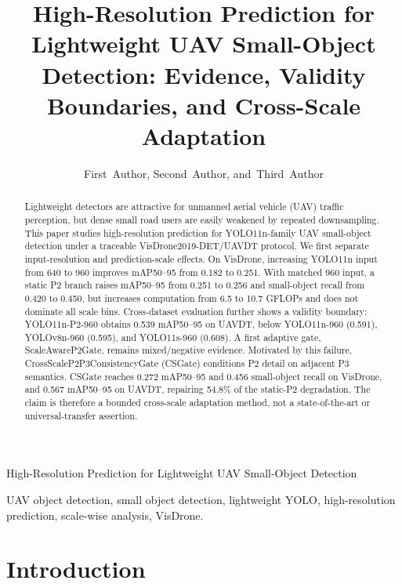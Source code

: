 \documentclass[journal]{IEEEtran}
\begin{document}
\title{High-Resolution Prediction for Lightweight UAV Small-Object Detection: Evidence, Validity Boundaries, and Cross-Scale Adaptation}

\author{First~Author,
        Second~Author,
        and~Third~Author}

%
{High-Resolution Prediction for Lightweight UAV Small-Object Detection}

\maketitle

\begin{abstract}
Lightweight detectors are attractive for unmanned aerial vehicle (UAV) traffic perception, but dense small road users are easily weakened by repeated downsampling. This paper studies high-resolution prediction for YOLO11n-family UAV small-object detection under a traceable VisDrone2019-DET/UAVDT protocol. We first separate input-resolution and prediction-scale effects. On VisDrone, increasing YOLO11n input from 640 to 960 improves mAP50--95 from 0.182 to 0.251. With matched 960 input, a static P2 branch raises mAP50--95 from 0.251 to 0.256 and small-object recall from 0.420 to 0.450, but increases computation from 6.5 to 10.7 GFLOPs and does not dominate all scale bins. Cross-dataset evaluation further shows a validity boundary: YOLO11n-P2-960 obtains 0.539 mAP50--95 on UAVDT, below YOLO11n-960 (0.591), YOLOv8n-960 (0.595), and YOLO11s-960 (0.608). A first adaptive gate, ScaleAwareP2Gate, remains mixed/negative evidence. Motivated by this failure, CrossScaleP2P3ConsistencyGate (CSGate) conditions P2 detail on adjacent P3 semantics. CSGate reaches 0.272 mAP50--95 and 0.456 small-object recall on VisDrone, and 0.567 mAP50--95 on UAVDT, repairing 54.8\% of the static-P2 degradation. The claim is therefore a bounded cross-scale adaptation method, not a state-of-the-art or universal-transfer assertion.
\end{abstract}

\begin{IEEEkeywords}
UAV object detection, small object detection, lightweight YOLO, high-resolution prediction, scale-wise analysis, VisDrone.
\end{IEEEkeywords}

\section{Introduction}
\end{document}
